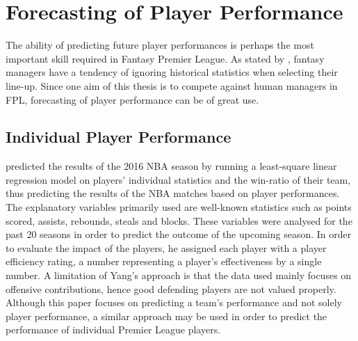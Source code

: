 \begin{comment}
There is limited research available on optimization of a Fantasy Premier League team. However, due to the large amount of active NFL Fantasy Sports players, literature is available for both season- and weekly format. \cite{King} suggested a model for predicting points for the quarterbacks in the NFL, using Backward Stepwise regression and Support Vector regression models in his research. Further, he predicted fantasy points by use of Artificial Neural Networks. Similar approaches can be used in order to predict the performance of the Premier League players.
\end{comment}


\section{Forecasting of Player Performance} \label{Forecasting_of_future_performance}

The ability of predicting future player performances is perhaps the most important skill required in Fantasy Premier League. As stated by \cite{Smith}, fantasy managers have a tendency of ignoring historical statistics when selecting their line-up. Since one aim of this thesis is to compete against human managers in FPL, forecasting of player performance can be of great use. 

\subsection{Individual Player Performance} \label{Forecasting_of_player_performance}

\cite{Yang} predicted the results of the 2016 NBA season by running a least-square linear regression model on players’ individual statistics and the win-ratio of their team, thus predicting the results of the NBA matches based on player performances. The explanatory variables primarily used are well-known statistics such as points scored, assists, rebounds, steals and blocks. These variables were analysed for the past 20 seasons in order to predict the outcome of the upcoming season. In order to evaluate the impact of the players, he assigned each player with a player efficiency rating, a number representing a player’s effectiveness by a single number. A limitation of Yang’s approach is that the data used mainly focuses on offensive contributions, hence good defending players are not valued properly. Although this paper focuses on predicting a team’s performance and not solely player performance, a similar approach may be used in order to predict the performance of individual Premier League players. 

